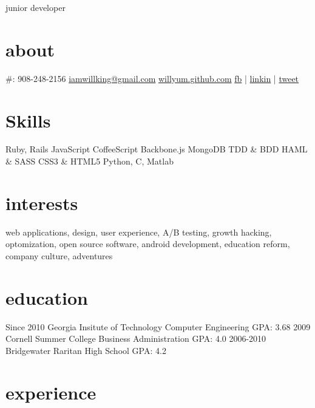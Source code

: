 \documentclass[]{cv}
\begin{document}
       {junior developer}

\begin{aside}
  \section{about}
     \#: 908-248-2156
    \href{mailto:iamwillking@gmail.com}{iamwillking@gmail.com}
    \href{http://willyum.github.com}{willyum.github.com}
    \href{http://facebook.com/iamwillking}{fb} | \href{http://www.linkedin.com/profile/view?id=158614185}{linkin} | \href{https://twitter.com/#!/iamwillking}{tweet}
  \section{Skills}
    Ruby, Rails
    JavaScript
    CoffeeScript
    Backbone.js
    MongoDB
    TDD \& BDD
    HAML \& SASS
    CSS3 \& HTML5
    Python, C, Matlab
\end{aside}

\section{interests}

web applications, design, user experience, A/B testing, growth hacking, optomization, open source software, android development, education reform, company culture, adventures

\section{education}

\begin{entrylist}
  \entry
    {Since 2010}
    {Georgia Insitute of Technology}
    {Computer Engineering}
    {GPA: 3.68\newline}
  \entry
    {2009}
    {Cornell Summer College}
    {Business Administration}
    {GPA: 4.0\newline}
  \entry
    {2006-2010}
    {Bridgewater Raritan High School}
    {}
    {GPA: 4.2\newline}
\end{entrylist}

\section{experience}
\end{document}
